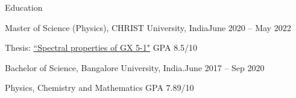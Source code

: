 \begin{rSection}{Education}
\begin{rSubsection}{Master of Science (Physics), CHRIST University, India}{June 2020 – May 2022}{}{}
\item Thesis: \href{https://drive.google.com/file/d/1FP9Bz25hufUrWuRfMA0RLzUTm0Spqp-I/view?usp=sharing}{``Spectral properties of GX 5-1"} \hspace{23.7em} GPA 8.5/10
\end{rSubsection}
\vspace{-0.5em}
\begin{rSubsection}{Bachelor of Science, Bangalore University, India.}{June 2017 – Sep 2020}{}{}
\item Physics, Chemistry and Mathematics \hspace{24.3em} GPA 7.89/10
\end{rSubsection}
\end{rSection}